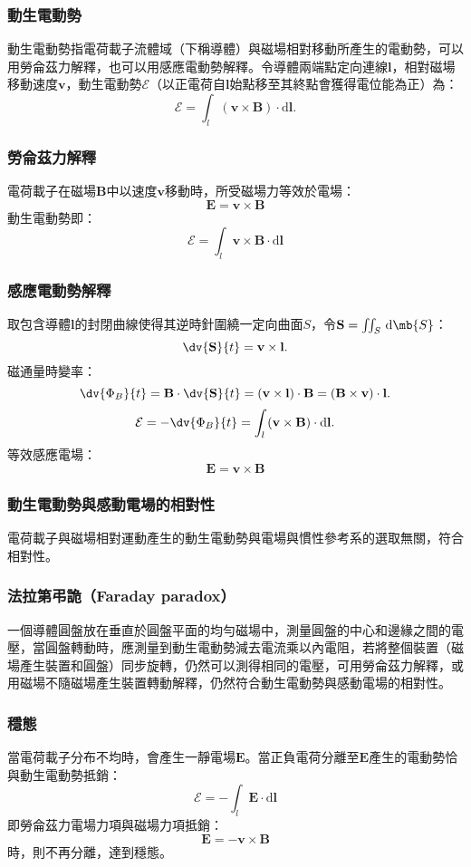 \documentclass[a4paper,12pt]{report}
\begin{document}
\begin{itemize}
\subsubsection{動生電動勢}
動生電動勢指電荷載子流體域（下稱導體）與磁場相對移動所產生的電動勢，可以用勞侖茲力解釋，也可以用感應電動勢解釋。令導體兩端點定向連線$\mathbf{l}$，相對磁場移動速度$\mathbf{v}$，動生電動勢$\mathcal{E}$（以正電荷自$\mathbf{l}$始點移至其終點會獲得電位能為正）為：
\[\mathcal{E}=\int_{l}\left(\mathbf{v}\times\mathbf{B}\right)\cdot\mathrm{d}\mathbf{l}.\]
\subsubsection{勞侖茲力解釋}
電荷載子在磁場$\mathbf{B}$中以速度$\mathbf{v}$移動時，所受磁場力等效於電場：
\[\mathbf{E}=\mathbf{v}\times\mathbf{B}\]
動生電動勢即：
\[\mathcal{E}=\int_l\mathbf{v}\times\mathbf{B}\cdot\mathrm{d}\mathbf{l}\]
\subsubsection{感應電動勢解釋}
取包含導體$\mathbf{l}$的封閉曲線使得其逆時針圍繞一定向曲面$S$，令$\mathbf{S}=\iint_S\,\mathrm{d}\mb{S}$：
\[\dv{\mathbf{S}}{t}=\mathbf{v}\times\mathbf{l}.\]
磁通量時變率：
\[\dv{\Phi_B}{t}=\mathbf{B}\cdot\dv{\mathbf{S}}{t}=(\mathbf{v}\times\mathbf{l})\cdot\mathbf{B}=(\mathbf{B}\times\mathbf{v})\cdot\mathbf{l}.\]
\[\mathcal{E}=-\dv{\Phi_B}{t}=\int_{l}\left(\mathbf{v}\times\mathbf{B}\right)\cdot\mathrm{d}\mathbf{l}.\]
等效感應電場：
\[\mathbf{E}=\mathbf{v}\times\mathbf{B}\]
\subsubsection{動生電動勢與感動電場的相對性}
電荷載子與磁場相對運動產生的動生電動勢與電場與慣性參考系的選取無關，符合相對性。
\subsubsection{法拉第弔詭（Faraday paradox）}
一個導體圓盤放在垂直於圓盤平面的均勻磁場中，測量圓盤的中心和邊緣之間的電壓，當圓盤轉動時，應測量到動生電動勢減去電流乘以內電阻，若將整個裝置（磁場產生裝置和圓盤）同步旋轉，仍然可以測得相同的電壓，可用勞侖茲力解釋，或用磁場不隨磁場產生裝置轉動解釋，仍然符合動生電動勢與感動電場的相對性。
\subsubsection{穩態}
當電荷載子分布不均時，會產生一靜電場$\mathbf{E}$。當正負電荷分離至$\mathbf{E}$產生的電動勢恰與動生電動勢抵銷：
\[\mathcal{E}=-\int_l\mathbf{E}\cdot\mathrm{d}\mathbf{l}\]
即勞侖茲力電場力項與磁場力項抵銷：
\[\mathbf{E}=-\mathbf{v}\times\mathbf{B}\]
時，則不再分離，達到穩態。

\end{itemize}
\end{document}
